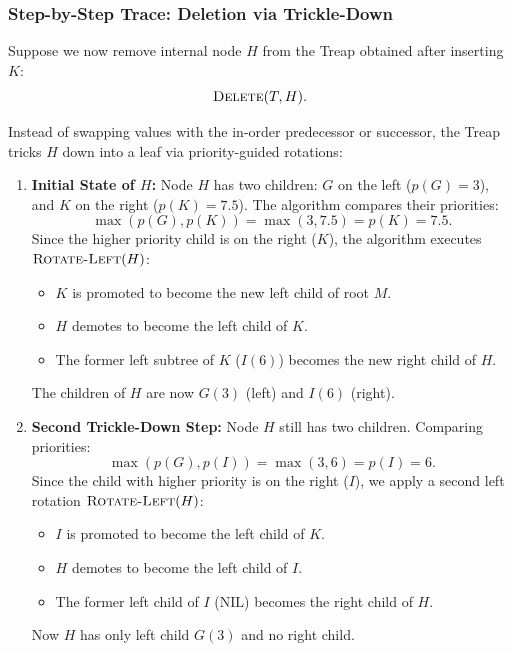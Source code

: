 \subsubsection{Step-by-Step Trace: Deletion via Trickle-Down}
Suppose we now remove internal node $H$ from the Treap obtained after inserting $K$:
\begin{equation}
  \textsc{Delete}(T, H).
\end{equation}

Instead of swapping values with the in-order predecessor or successor, the Treap tricks $H$ down into a leaf via priority-guided rotations:
\begin{enumerate}
    \item \textbf{Initial State of $H$:}
    Node $H$ has two children: $G$ on the left ($p(G) = 3$), and $K$ on the right ($p(K) = 7.5$).
    The algorithm compares their priorities:
    \begin{equation}
      \max(p(G), p(K)) = \max(3, 7.5) = p(K) = 7.5.
    \end{equation}
    Since the higher priority child is on the right ($K$), the algorithm executes $\textsc{Rotate-Left}(H)$:
    \begin{itemize}
        \item $K$ is promoted to become the new left child of root $M$.
        \item $H$ demotes to become the left child of $K$.
        \item The former left subtree of $K$ ($I(6)$) becomes the new right child of $H$.
    \end{itemize}
    The children of $H$ are now $G(3)$ (left) and $I(6)$ (right).
    
    \item \textbf{Second Trickle-Down Step:}
    Node $H$ still has two children. Comparing priorities:
    \begin{equation}
      \max(p(G), p(I)) = \max(3, 6) = p(I) = 6.
    \end{equation}
    Since the child with higher priority is on the right ($I$), we apply a second left rotation $\textsc{Rotate-Left}(H)$:
    \begin{itemize}
        \item $I$ is promoted to become the left child of $K$.
        \item $H$ demotes to become the left child of $I$.
        \item The former left child of $I$ ($\mathrm{NIL}$) becomes the right child of $H$.
    \end{itemize}
    Now $H$ has only left child $G(3)$ and no right child.
    

\end{enumerate}
